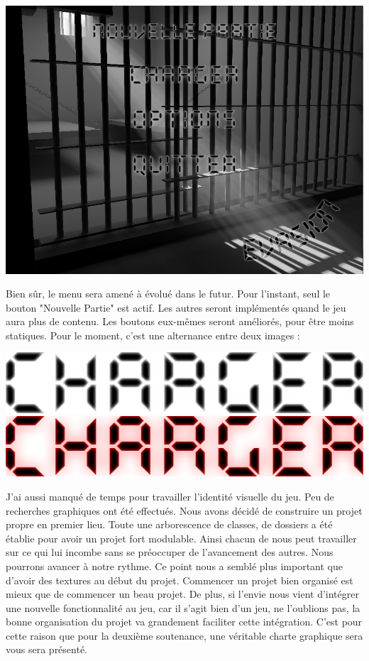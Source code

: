 \documentclass{article}
\begin{document}
 \begin{center}
\includegraphics[scale=0.3]{menu}
\end{center}


Bien sûr, le menu sera amené à évolué dans le futur. Pour l'instant, seul le bouton "Nouvelle Partie" est actif. Les autres seront implémentés quand le jeu aura plus de contenu. Les boutons eux-mêmes seront améliorés, pour être moins statiques. Pour le moment, c'est une alternance entre deux images :

\begin{center}
\includegraphics[scale=0.35]{off}
\hspace*{1.0cm}
\includegraphics[scale=0.35]{on}
\end{center}

\newpage
J'ai aussi manqué de temps pour travailler l'identité visuelle du jeu. Peu de recherches graphiques ont été effectués. Nous avons décidé de construire un projet propre en premier lieu. Toute une arborescence de classes, de dossiers a été établie pour avoir un projet fort modulable. Ainsi chacun de nous peut travailler sur ce qui lui incombe sans se préoccuper de l'avancement des autres. Nous pourrons avancer à notre rythme. Ce point nous a semblé plus important que d'avoir des textures au début du projet. Commencer un projet bien organisé est mieux que de commencer un beau projet. De plus, si l'envie nous vient d'intégrer une nouvelle fonctionnalité au jeu, car il s'agit bien d'un jeu, ne l'oublions pas, la bonne organisation du projet va grandement faciliter cette intégration. C'est pour cette raison que pour la deuxième soutenance, une véritable charte graphique sera vous sera présenté.
\end{document}
